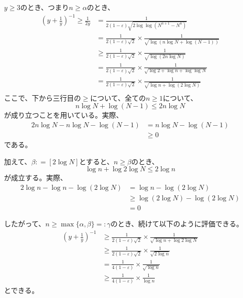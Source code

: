      $y \ge 3$のとき、つまり$n \ge \alpha$のとき、
      \begin{align*}
        \left( y + \frac{1}{y} \right)^{-1} \ge \frac{1}{2y} &= \frac{1}{2(1 - \varepsilon)\sqrt{2\log\log(N^{n+1} - N^n)}}\\
        &= \frac{1}{2(1 - \varepsilon)\sqrt{2}}\times \frac{1}{\sqrt{\log (n\log N + \log (N-1))}}\\
        &\ge \frac{1}{2(1 - \varepsilon)\sqrt{2}}\times \frac{1}{\sqrt{\log(2n\log N) }}\\
        &= \frac{1}{2(1 - \varepsilon)\sqrt{2}}\times \frac{1}{\sqrt{\log2 + \log n + \log\log N}}\\
        &= \frac{1}{2(1 - \varepsilon)\sqrt{2}}\times \frac{1}{\sqrt{\log n + \log (2\log N)}}\\
      \end{align*}
      ここで、下から三行目の$\ge$について、全ての$n \ge 1$について、
      \[ n\log N + \log (N-1) \leq 2n\log N\]
      が成り立つことを用いている。実際、
      \begin{align*}
        2n\log N - n\log N - \log (N-1) &= n\log N - \log (N-1)\\
        &\ge 0
      \end{align*}
      である。

      加えて、$\beta \colon = [2\log N]$とすると、$n \ge \beta$のとき、
      \[\log n + \log 2\log N \leq 2\log n\]
      が成立する。実際、
      \begin{align*}
        2\log n - \log n - \log (2\log N) &= \log n - \log (2\log N)\\
        &\ge \log (2\log N) - \log (2\log N) \\
        &= 0
      \end{align*}

      したがって、$n \ge \max\{\alpha, \beta\} =\colon \gamma$のとき、続けて以下のように評価できる。
      \begin{align*}
        \left( y + \frac{1}{y} \right)^{-1} &\ge \frac{1}{2(1 - \varepsilon)\sqrt{2}}\times \frac{1}{\sqrt{\log n + \log 2\log N}}\\
        &\ge \frac{1}{2(1 - \varepsilon)\sqrt{2}}\times \frac{1}{\sqrt{2\log n }}\\
        &= \frac{1}{4(1 - \varepsilon)} \times \frac{1}{\sqrt{\log n }}\\
        &\ge \frac{1}{4(1 - \varepsilon)} \times \frac{1}{\log n}
      \end{align*}
      とできる。

